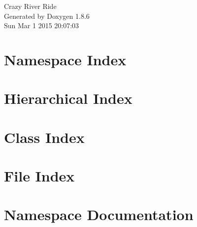 \documentclass[twoside]{book}
\newcommand{\clearemptydoublepage}{%
  \newpage{\pagestyle{empty}\cleardoublepage}%
}
\begin{document}
\hypersetup{pageanchor=false}
\begin{titlepage}
\vspace*{7cm}
\begin{center}%
{\Large Crazy River Ride }\\
\vspace*{1cm}
{\large Generated by Doxygen 1.8.6}\\
\vspace*{0.5cm}
{\small Sun Mar 1 2015 20:07:03}\\
\end{center}
\end{titlepage}
\clearemptydoublepage
\tableofcontents
\clearemptydoublepage
{}
\hypersetup{pageanchor=true}

\chapter{Namespace Index}

\chapter{Hierarchical Index}

\chapter{Class Index}

\chapter{File Index}

\chapter{Namespace Documentation}



\end{document}
